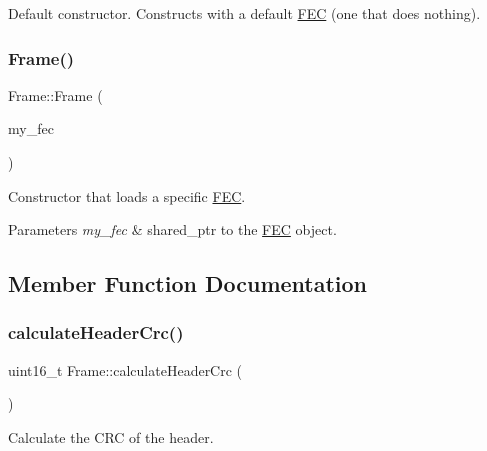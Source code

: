 Default constructor. Constructs with a default \hyperlink{classFEC}{F\+EC} (one that does nothing). \mbox{\label{classFrame_a230b093686859a8d614b81b19f0433a0}} 
\subsubsection{\texorpdfstring{Frame()}{Frame()}\hspace{0.1cm}{\footnotesize\ttfamily [2/2]}}
{\footnotesize\ttfamily Frame\+::\+Frame (\begin{DoxyParamCaption}\item[{shared\+\_\+ptr$<$ \hyperlink{classFEC}{F\+EC} $>$}]{my\+\_\+fec }\end{DoxyParamCaption})\hspace{0.3cm}{\ttfamily [inline]}}

Constructor that loads a specific \hyperlink{classFEC}{F\+EC}. 
\begin{DoxyParams}{Parameters}
{\em my\+\_\+fec} & shared\+\_\+ptr to the \hyperlink{classFEC}{F\+EC} object. \\
\hline
\end{DoxyParams}


\subsection{Member Function Documentation}
\mbox{\label{classFrame_a3e45887a93b6173b1c56bde945524e8c}} 
\subsubsection{\texorpdfstring{calculate\+Header\+Crc()}{calculateHeaderCrc()}}
{\footnotesize\ttfamily uint16\+\_\+t Frame\+::calculate\+Header\+Crc (\begin{DoxyParamCaption}\item[{void}]{ }\end{DoxyParamCaption})}

Calculate the C\+RC of the header. \mbox{\label{classFrame_adbb695fdefa7b4c464620b0048016b0a}} 
